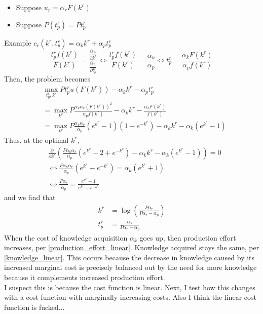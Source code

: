 \documentclass[source/paper/main.tex]{subfiles}
\begin{document}
\begin{itemize}
    \item Suppose $u_r = \alpha_r F(k^r)$
    \item Suppose $P(t_p^r) = P t_p^r$
\end{itemize}
Example $c_r(k^r, t_p^r) = \alpha_k k^r + \alpha_p t_p^r$\\
$$\frac{t_p^r f(k^r) }{F(k^r)} = \frac{\frac{\partial c_r}{\partial k^r}}{\frac{\partial c_r}{\partial t_p^r}} \iff \frac{t_p^r f(k^r) }{F(k^r)} = \frac{\alpha_k}{\alpha_p} \iff t_p^r = \frac{\alpha_k F(k^r)}{\alpha_p f(k^r)}$$
Then, the problem becomes
\begin{align*}
    &\max_{t_p^r, k^r} P t_p^r u(F(k^r)) - \alpha_k k^r - \alpha_p t_p^r \\
    &= \max_{k^r} P\frac{\alpha_k\alpha_r (F(k^r))^2}{\alpha_p f(k^r)}  - \alpha_k k^r - \frac{\alpha_k F(k^r)}{f(k^r)} \\
    &= \max_{k^r} P\frac{\alpha_k\alpha_r}{\alpha_p} (e^{k^r} - 1)(1-e^{-k^r})  - \alpha_k k^r -\alpha_k (e^{k^r} - 1) 
\end{align*}
Thus, at the optimal $k^r$, 
\begin{align*}
    &\frac{\partial }{\partial k^r} \left(  \frac{P\alpha_k\alpha_r}{\alpha_p} (e^{k^r} - 2 + e^{-k^r}) - \alpha_k k^r - \alpha_k (e^{k^r} - 1)\right) = 0 \\
    &\iff   \frac{P\alpha_k\alpha_r}{\alpha_p} (e^{k^r} - e^{-k^r})  = \alpha_k(e^{k^r} + 1) \\
    &\iff \frac{P\alpha_r}{\alpha_p}  = \frac{e^{k^r} + 1}{e^{k^r} - e^{-k^r}} 
\end{align*}
and we find that
\begin{align}
    k^r &= \log\left(\frac{P\alpha_r}{P\alpha_r-\alpha_p}\right) \label{knowledge_linear}\\
    t_p^r &= \frac{\alpha_k}{P\alpha_r - \alpha_p}   \label{production_effort_linear} 
\end{align}
When the cost of knowledge acquisition $\alpha_k$ goes up, then production effort increases, per \ref{production_effort_linear}. Knowledge acquired stays the same, per \ref{knowledge_linear}. This occurs because the decrease in knowledge caused by its increased marginal cost is precisely balanced out by the need for more knowledge because it complements increased production effort. \\
I suspect this is because the cost function is linear. Next, I test how this changes with a cost function with marginally increasing costs. Also I think the linear cost function is fucked...
\end{document}
